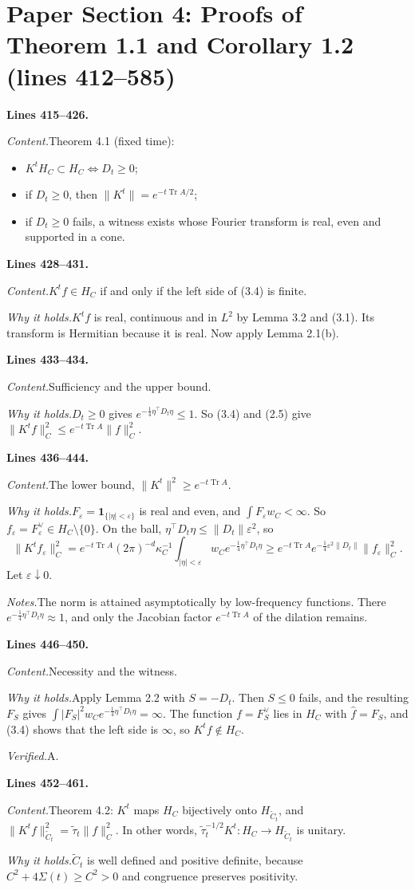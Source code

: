 \documentclass[11pt]{amsart}
\newcommand{\Tr}{\operatorname{Tr}}
\newcommand{\Ct}{\widetilde{C}_t}
\newcommand{\taut}{\widetilde{\tau}_t}
\newcommand{\hatf}[1]{\widehat{#1}}
\newcommand{\tp}{\top}
\newcommand{\src}[1]{\par\bigskip\noindent\textbf{Lines #1.}\enspace}
\newcommand{\content}{\par\smallskip\noindent\textit{Content.}\enspace}
\newcommand{\why}{\par\smallskip\noindent\textit{Why it holds.}\enspace}
\newcommand{\verified}{\par\smallskip\noindent\textit{Verified.}\enspace}
\newcommand{\notes}{\par\smallskip\noindent\textit{Notes.}\enspace}
\newcommand{\tA}{\textsf{A}}
\begin{document}
\section{Paper Section 4: Proofs of Theorem 1.1 and Corollary 1.2 (lines 412--585)}\label{sec:proofs}

\src{415--426}
\content Theorem 4.1 (fixed time):
\begin{itemize}
\item[(a)] $K^tH_C\subset H_C\iff D_t\ge0$;
\item[(b)] if $D_t\ge0$, then $\|K^t\|=e^{-t\Tr A/2}$;
\item[(c)] if $D_t\ge0$ fails, a witness exists whose Fourier transform is real, even and supported in a cone.
\end{itemize}

\src{428--431}
\content $K^tf\in H_C$ if and only if the left side of (3.4) is finite.
\why $K^tf$ is real, continuous and in $L^2$ by Lemma 3.2 and (3.1). Its transform is Hermitian because it is real.
Now apply Lemma 2.1(b).

\src{433--434}
\content Sufficiency and the upper bound.
\why $D_t\ge0$ gives $e^{-\frac14\eta^\tp D_t\eta}\le1$. So (3.4) and (2.5) give
$\|K^tf\|_C^2\le e^{-t\Tr A}\|f\|_C^2$.

\src{436--444}
\content The lower bound, $\|K^t\|^2\ge e^{-t\Tr A}$.
\why $F_\varepsilon=\mathbf 1_{\{|\eta|<\varepsilon\}}$ is real and even, and $\int F_\varepsilon w_C<\infty$. So
$f_\varepsilon=F_\varepsilon^\vee\in H_C\setminus\{0\}$. On the ball, $\eta^\tp D_t\eta\le\|D_t\|\varepsilon^2$, so
\[
\|K^tf_\varepsilon\|_C^2=e^{-t\Tr A}(2\pi)^{-d}\kappa_C^{-1}\int_{|\eta|<\varepsilon}w_Ce^{-\frac14\eta^\tp D_t\eta}
\ge e^{-t\Tr A}e^{-\frac14\varepsilon^2\|D_t\|}\|f_\varepsilon\|_C^2 .
\]
Let $\varepsilon\downarrow0$.
\notes The norm is attained asymptotically by low-frequency functions. There $e^{-\frac14\eta^\tp D_t\eta}\approx1$,
and only the Jacobian factor $e^{-t\Tr A}$ of the dilation remains.

\src{446--450}
\content Necessity and the witness.
\why Apply Lemma 2.2 with $S=-D_t$. Then $S\le0$ fails, and the resulting $F_S$ gives
$\int|F_S|^2w_Ce^{-\frac14\eta^\tp D_t\eta}=\infty$. The function $f=F_S^\vee$ lies in $H_C$ with $\hatf f=F_S$, and
(3.4) shows that the left side is $\infty$, so $K^tf\notin H_C$.
\verified \tA.

\src{452--461}
\content Theorem 4.2: $K^t$ maps $H_C$ bijectively onto $H_{\Ct}$, and $\|K^tf\|_{\Ct}^2=\taut\|f\|_C^2$. In other
words, $\taut^{-1/2}K^t\colon H_C\to H_{\Ct}$ is unitary.
\why $\Ct$ is well defined and positive definite, because $C^2+4\Sigma(t)\ge C^2>0$ and congruence preserves
positivity.
\end{document}
